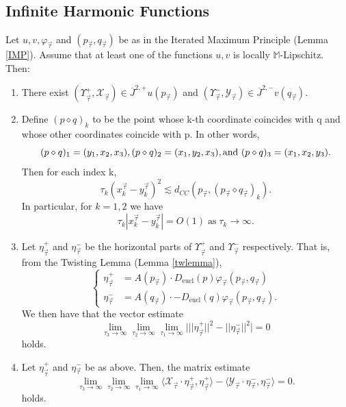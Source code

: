 \documentclass[reqno]{amsart}
\newcommand{\eucl}{\operatorname{eucl}}
\begin{document}
\subsection{Infinite Harmonic Functions}
\begin{lemma}\label{inflemma}
Let $u,v,\varphi_{\vec{\tau}}$ and $(p_{\vec{\tau}},q_{\vec{\tau}})$ be as in the Iterated Maximum Principle (Lemma \ref{IMP}). Assume that at least one of the functions $u,v$ is locally $\mathbb{M}$-Lipschitz. Then:
\begin{enumerate}
\renewcommand{\labelenumi}{(\Alph{enumi})}
\item There exist $(\Upsilon^+_{\vec{\tau}},\mathcal{X}_{\vec{\tau}})\in\overline{J}^{2,+}u(p_{\vec{\tau}})$ and $(\Upsilon^-_{\vec{\tau}},\mathcal{Y}_{\vec{\tau}})\in\overline{J}^{2,-}v(q_{\vec{\tau}}).$
\item Define $(p\diamond q)_k$ to be the point whose k-th coordinate coincides with q and whose other coordinates coincide with p. In other words,
\begin{equation*}
(p\diamond q)_1 = (y_1,x_2,x_3), 
(p\diamond q)_2 = (x_1,y_2,x_3), 
\textmd{and\ }(p\diamond q)_3 = (x_1,x_2,y_3).
\end{equation*}
Then for each index k,
\begin{equation}\label{7.1}
\tau_k(x_k^{\vec{\tau}}-y_k^{\vec{\tau}})^2\lesssim d_{CC}(p_{\vec{\tau}},(p_{\vec{\tau}}\diamond q_{\vec{\tau}})_k).
\end{equation}
In particular, for $k=1,2$ we have
\begin{equation}\label{7.2}
\tau_k|x_k^{\vec{\tau}}-y_k^{\vec{\tau}}|=O(1)\;\text{as}\;\tau_k\rightarrow \infty.
\end{equation}
\item Let $\eta^+_{\vec{\tau}}$ and $\eta^-_{\vec{\tau}}$ be the horizontal parts of $\Upsilon^+_{\vec{\tau}}$ and $\Upsilon^-_{\vec{\tau}}$ respectively. That is, from the Twisting Lemma (Lemma \ref{twlemma}), 
\[\left\{
\begin{aligned}
\eta^+_{\vec{\tau}}&= A(p_{\vec{\tau}})\cdot D_{\eucl}(p)\varphi_{\vec{\tau}}(p_{\vec{\tau}},q_{\vec{\tau}})\\
\eta^-_{\vec{\tau}}&= A(q_{\vec{\tau}})\cdot -D_{\eucl}(q)\varphi_{\vec{\tau}}(p_{\vec{\tau}},q_{\vec{\tau}}).
\end{aligned}
\right.\]
We then have that the vector estimate 
\begin{equation}\label{7.3}
\lim_{\tau_3\to\infty}\lim_{\tau_2\to\infty}\lim_{\tau_1\to\infty}\big|||\eta^+_{\vec{\tau}}||^2-||\eta^-_{\vec{\tau}}||^2\big|=0
\end{equation}
holds.
\item Let $\eta^+_{\vec{\tau}}$ and $\eta^-_{\vec{\tau}}$ be as above. Then, the matrix estimate 
\begin{equation}\label{7.4}
\lim_{\tau_3\to\infty}\lim_{\tau_2\to\infty}\lim_{\tau_1\to\infty}\langle\mathcal{X}_{\vec{\tau}}\cdot\eta^+_{\vec{\tau}},\eta^+_{\vec{\tau}}\rangle-\langle\mathcal{Y}_{\vec{\tau}}\cdot\eta^-_{\vec{\tau}},\eta^-_{\vec{\tau}}\rangle=0.
\end{equation}
holds.
\end{enumerate}
\end{lemma}
\end{document}
